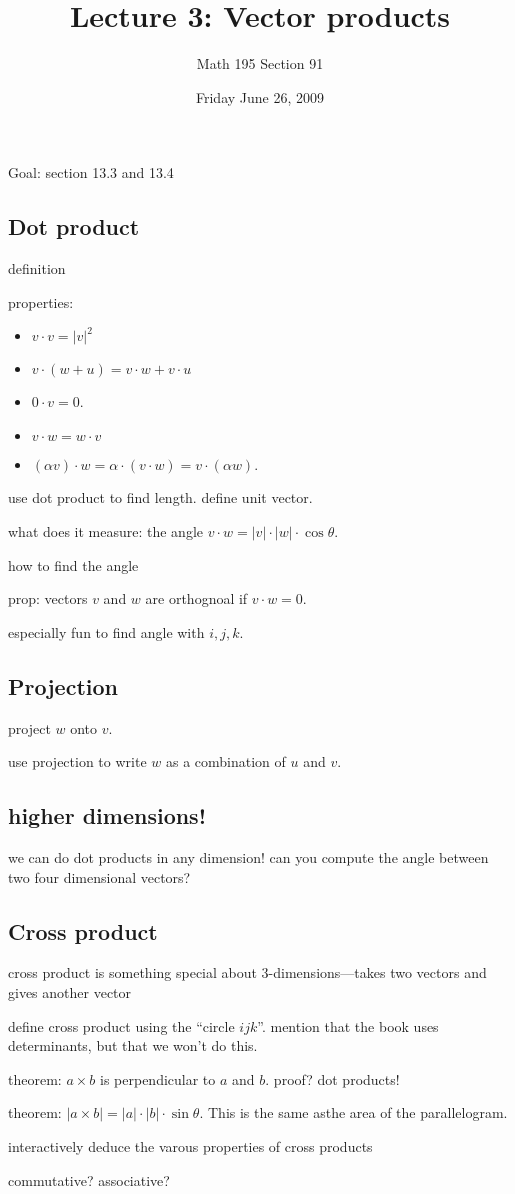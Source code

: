\documentclass[12pt]{article}
\title{Lecture 3: Vector products}
\author{Math 195 Section 91}
\date{Friday June 26, 2009}
\begin{document}
\maketitle

Goal: section 13.3 and 13.4

\subsection*{Dot product}

definition

properties:
\begin{itemize}
\item $v \cdot v = |v|^2$
\item $v \cdot (w + u) = v \cdot w + v \cdot u$
\item $0 \cdot v = 0$.
\item $v \cdot w = w \cdot v$
\item $(\alpha v) \cdot w = \alpha \cdot (v \cdot w) = v \cdot (\alpha w)$.
\end{itemize}

use dot product to find length.  define unit vector.

what does it measure: the angle $v \cdot w = |v| \cdot |w| \cdot \cos \theta$.

how to find the angle

prop: vectors $v$ and $w$ are orthognoal if $v \cdot w = 0$.

especially fun to find angle with $i, j, k$.

\subsection{Projection}

project $w$ onto $v$.

use projection to write $w$ as a combination of $u$ and $v$.

\subsection{higher dimensions!}

we can do dot products in any dimension!  can you compute the angle
between two four dimensional vectors?

\subsection{Cross product}

cross product is something special about 3-dimensions---takes two vectors and gives another vector

define cross product using the ``circle $ijk$''.  mention that the book uses determinants, but that we won't do this.

theorem: $a \times b$ is perpendicular to $a$ and $b$.  proof?  dot products!

theorem: $|a \times b| = |a| \cdot |b| \cdot \sin \theta$.  This is the same asthe area of the parallelogram.

interactively deduce the varous properties of cross products

commutative?  associative?  
\end{document}
